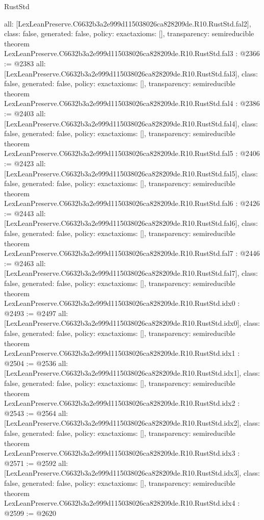 \begin{lexlean}{RustStd}
\begin{coremodule}
{  all: [LexLeanPreserve.C6632b3a2e999d115038026ca828209de.R10.RustStd.fal2],
  class: false,
  generated: false,
  policy: exact{axioms: []},
  transparency: semireducible
}
theorem LexLeanPreserve.C6632b3a2e999d115038026ca828209de.R10.RustStd.fal3 : @2366 := @2383 {
  all: [LexLeanPreserve.C6632b3a2e999d115038026ca828209de.R10.RustStd.fal3],
  class: false,
  generated: false,
  policy: exact{axioms: []},
  transparency: semireducible
}
theorem LexLeanPreserve.C6632b3a2e999d115038026ca828209de.R10.RustStd.fal4 : @2386 := @2403 {
  all: [LexLeanPreserve.C6632b3a2e999d115038026ca828209de.R10.RustStd.fal4],
  class: false,
  generated: false,
  policy: exact{axioms: []},
  transparency: semireducible
}
theorem LexLeanPreserve.C6632b3a2e999d115038026ca828209de.R10.RustStd.fal5 : @2406 := @2423 {
  all: [LexLeanPreserve.C6632b3a2e999d115038026ca828209de.R10.RustStd.fal5],
  class: false,
  generated: false,
  policy: exact{axioms: []},
  transparency: semireducible
}
theorem LexLeanPreserve.C6632b3a2e999d115038026ca828209de.R10.RustStd.fal6 : @2426 := @2443 {
  all: [LexLeanPreserve.C6632b3a2e999d115038026ca828209de.R10.RustStd.fal6],
  class: false,
  generated: false,
  policy: exact{axioms: []},
  transparency: semireducible
}
theorem LexLeanPreserve.C6632b3a2e999d115038026ca828209de.R10.RustStd.fal7 : @2446 := @2463 {
  all: [LexLeanPreserve.C6632b3a2e999d115038026ca828209de.R10.RustStd.fal7],
  class: false,
  generated: false,
  policy: exact{axioms: []},
  transparency: semireducible
}
theorem LexLeanPreserve.C6632b3a2e999d115038026ca828209de.R10.RustStd.idx0 : @2493 := @2497 {
  all: [LexLeanPreserve.C6632b3a2e999d115038026ca828209de.R10.RustStd.idx0],
  class: false,
  generated: false,
  policy: exact{axioms: []},
  transparency: semireducible
}
theorem LexLeanPreserve.C6632b3a2e999d115038026ca828209de.R10.RustStd.idx1 : @2504 := @2536 {
  all: [LexLeanPreserve.C6632b3a2e999d115038026ca828209de.R10.RustStd.idx1],
  class: false,
  generated: false,
  policy: exact{axioms: []},
  transparency: semireducible
}
theorem LexLeanPreserve.C6632b3a2e999d115038026ca828209de.R10.RustStd.idx2 : @2543 := @2564 {
  all: [LexLeanPreserve.C6632b3a2e999d115038026ca828209de.R10.RustStd.idx2],
  class: false,
  generated: false,
  policy: exact{axioms: []},
  transparency: semireducible
}
theorem LexLeanPreserve.C6632b3a2e999d115038026ca828209de.R10.RustStd.idx3 : @2571 := @2592 {
  all: [LexLeanPreserve.C6632b3a2e999d115038026ca828209de.R10.RustStd.idx3],
  class: false,
  generated: false,
  policy: exact{axioms: []},
  transparency: semireducible
}
theorem LexLeanPreserve.C6632b3a2e999d115038026ca828209de.R10.RustStd.idx4 : @2599 := @2620 {
}
\end{coremodule}
\end{lexlean}
